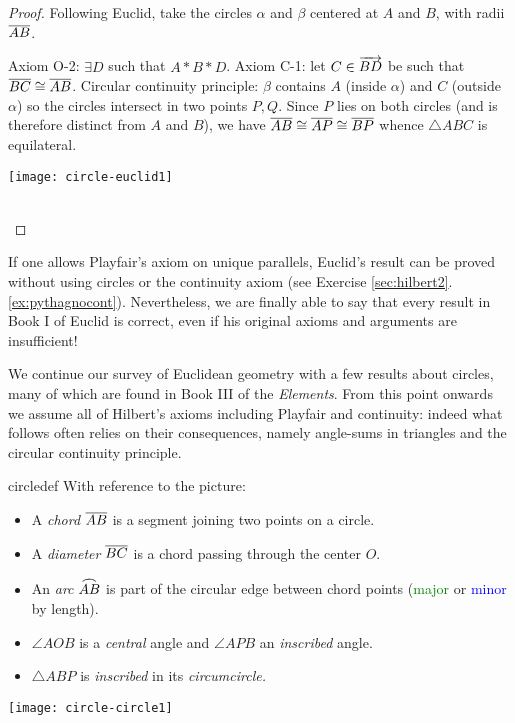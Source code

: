 \begin{proof}
	Following Euclid, take the circles $\alpha$ and $\beta$ centered at $A$ and $B$, with radii $\overline{AB}$.\par
	\begin{minipage}[t]{0.58\linewidth}\vspace{-5pt}
		Axiom O-2: $\exists D$ such that $A*B*D$.\smallbreak
		Axiom C-1: let $C\in\overrightarrow{BD}$ be such that $\overline{BC}\cong\overline{AB}$.\smallbreak
		Circular continuity principle: $\beta$ contains $A$ (inside $\alpha$) and $C$ (outside $\alpha$) so the circles intersect in two points $P,Q$.\smallbreak
		Since $P$ lies on both circles (and is therefore distinct from $A$ and $B$), we have $\overline{AB}\cong\overline{AP}\cong\overline{BP}$ whence $\triangle ABC$ is equilateral.
	\end{minipage}
	\hfill
	\begin{minipage}[t]{0.41\linewidth}\vspace{-5pt}
		\flushright
		\texttt{[image: circle-euclid1]}
	\end{minipage}\\[-5pt]
\end{proof}

If one allows Playfair's axiom on unique parallels, Euclid's result can be proved without using circles or the continuity axiom (see Exercise \ref*{sec:hilbert2}.\ref{ex:pythagnocont}). Nevertheless, we are finally able to say that every result in Book I of Euclid is correct, even if his original axioms and arguments are insufficient!




We continue our survey of Euclidean geometry with a few results about circles, many of which are found in Book III of the \emph{Elements}. From this point onwards we assume all of Hilbert's axioms including Playfair and continuity: indeed what follows often relies on their consequences, namely angle-sums in triangles and the circular continuity principle.

\begin{defn}[lower separated=false, sidebyside, sidebyside align=top seam, sidebyside gap=0pt, righthand width=0.35\linewidth]{}{circledef}
	With reference to the picture:
	\begin{itemize}\itemsep0pt
	  \item A \emph{chord} $\overline{AB}$ is a segment joining two points on a circle.
	  \item A \emph{diameter} $\overline{BC}$ is a chord passing through the center $O$.
	  \item An \emph{arc} $\arc{AB}$ is part of the circular edge between chord points (\textcolor{Green}{major} or \textcolor{blue}{minor} by length).
	  \item $\angle AOB$ is a \emph{central} angle and $\angle APB$ an \emph{inscribed} angle.
	  \item $\triangle ABP$ is \emph{inscribed} in its \emph{circumcircle.}
	\end{itemize}
	\tcblower
	\flushright
	\texttt{[image: circle-circle1]}
\end{defn}

